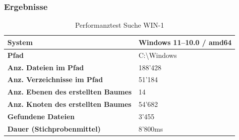 \documentclass[a4paper,12pt]{report}
\begin{document}
    \newpage

    \subsubsection{Ergebnisse}
    \begin{table}[h!]
        \centering
        \setlength{\leftmargini}{0.8cm}
        \begin{tabular}{|p{7cm}|p{5cm}|}
            \hline
            \textbf{System}                                     & Windows 11--10.0 / amd64 \\ \hline
            \textbf{Pfad}                                       & C:\textbackslash Windows \\ \hline
            \textbf{Anz. Dateien im Pfad}                       & 188'428                  \\ \hline
            \textbf{Anz. Verzeichnisse im Pfad}                 & 51'184                   \\ \hline
            \textbf{Anz. Ebenen \newline des erstellten Baumes} & 14                       \\ \hline
            \textbf{Anz. Knoten \newline des erstellten Baumes} & 54'682                   \\ \hline
            \textbf{Gefundene Dateien}                          & 3'455                    \\ \hline
            \textbf{Dauer (Stichprobenmittel)}                  & 8'800ms                  \\ \hline
        \end{tabular}
        \caption{Performanztest Suche WIN-1}\label{tab:perf-search-win-1}
    \end{table}
\end{document}
